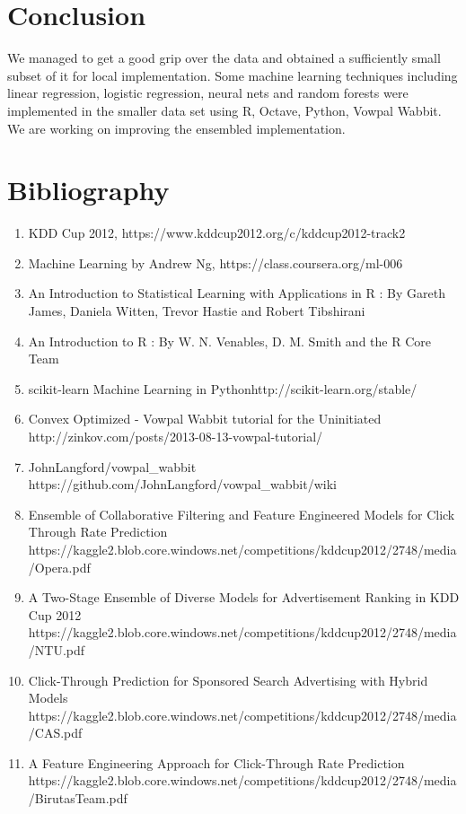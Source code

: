 \documentclass[10pt]{article}
\begin{document}
\section{Conclusion}
We managed to get a good grip over the data and obtained a sufficiently small subset of it for local implementation. Some machine learning techniques including linear regression, logistic regression, neural nets and random forests were implemented in the smaller data set using R, Octave, Python, Vowpal Wabbit. We are working on improving the ensembled implementation.
\section{Bibliography}
\begin{enumerate}
	\item KDD Cup 2012, https://www.kddcup2012.org/c/kddcup2012-track2
	\item Machine Learning by Andrew Ng, https://class.coursera.org/ml-006
	\item An Introduction to Statistical Learning with Applications in R : By Gareth James, Daniela Witten, Trevor Hastie and Robert Tibshirani
	\item An Introduction to R : By W. N. Venables, D. M. Smith and the R Core Team
	\item scikit-learn Machine Learning in Pythonhttp://scikit-learn.org/stable/
	\item Convex Optimized - Vowpal Wabbit tutorial for the Uninitiated http://zinkov.com/posts/2013-08-13-vowpal-tutorial/
	\item JohnLangford/vowpal\_wabbit https://github.com/JohnLangford/vowpal\_wabbit/wiki
	\item Ensemble of Collaborative Filtering and Feature Engineered Models for Click Through Rate Prediction https://kaggle2.blob.core.windows.net/competitions/kddcup2012/2748/media/Opera.pdf
	\item A Two-Stage Ensemble of Diverse Models for Advertisement Ranking in KDD Cup 2012 https://kaggle2.blob.core.windows.net/competitions/kddcup2012/2748/media/NTU.pdf
	\item Click-Through Prediction for Sponsored Search Advertising with Hybrid Models https://kaggle2.blob.core.windows.net/competitions/kddcup2012/2748/media/CAS.pdf
	\item A Feature Engineering Approach for Click-Through Rate Prediction https://kaggle2.blob.core.windows.net/competitions/kddcup2012/2748/media/BirutasTeam.pdf
\end{enumerate}
	

\nocite{*}		

		
\end{document}
